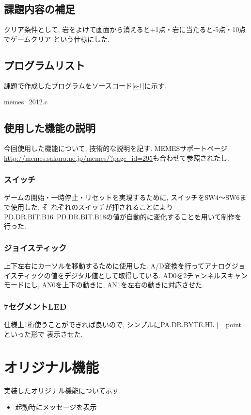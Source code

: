 \documentclass[a4j]{jsarticle}
\begin{document}
\subsection{課題内容の補足}
  クリア条件として, 岩をよけて画面から消えると+1点・岩に当たると-5点・10点でゲームクリア
  という仕様にした. 



\subsection{プログラムリスト}
課題で作成したプログラムをソースコード\ref{s-1}に示す. 


{memes_2012.c}

\subsection{使用した機能の説明}
今回使用した機能について, 技術的な説明を記す. MEMESサポートページ\url{http://memes.sakura.ne.jp/memes/?page_id=295}も合わせて参照されたし. 
\subsubsection{スイッチ}
  ゲームの開始・一時停止・リセットを実現するために, スイッチをSW4〜SW6まで使用した. そ
  れぞれのスイッチが押されることにより
  PD.DR.BIT.B16~PD.DR.BIT.B18の値が自動的に変化することを用いて制作を行った. 
  
\subsubsection{ジョイスティック}
  上下左右にカーソルを移動するために使用した. 
  A/D変換を行ってアナログジョイスティックの値をデジタル値として取得している. 
  AD0を2チャンネルスキャンモードにし, AN0を上下の動きに, AN1を左右の動きに対応させた. 
  
\subsubsection{7セグメントLED}
  仕様上1桁使うことができれば良いので, シンプルにPA.DR.BYTE.HL $|$= pointといった形で
  表示させた. 



\section{オリジナル機能}
  実装したオリジナル機能について示す. 
	\begin{itemize}
    	\item 起動時にメッセージを表示
    \end{itemize}
\end{document}
